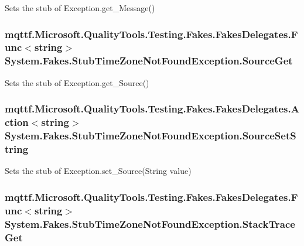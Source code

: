 Sets the stub of Exception.\-get\-\_\-\-Message()

\hypertarget{class_system_1_1_fakes_1_1_stub_time_zone_not_found_exception_a7784c90dbd515c3a17e0ddfee2022aed}{
\subsubsection[{Source\-Get}]{\setlength{\rightskip}{0pt plus 5cm}mqttf.\-Microsoft.\-Quality\-Tools.\-Testing.\-Fakes.\-Fakes\-Delegates.\-Func$<$string$>$ System.\-Fakes.\-Stub\-Time\-Zone\-Not\-Found\-Exception.\-Source\-Get}}\label{class_system_1_1_fakes_1_1_stub_time_zone_not_found_exception_a7784c90dbd515c3a17e0ddfee2022aed}


Sets the stub of Exception.\-get\-\_\-\-Source()

\hypertarget{class_system_1_1_fakes_1_1_stub_time_zone_not_found_exception_a2f222b92192c70897306738614d892a4}{
\subsubsection[{Source\-Set\-String}]{\setlength{\rightskip}{0pt plus 5cm}mqttf.\-Microsoft.\-Quality\-Tools.\-Testing.\-Fakes.\-Fakes\-Delegates.\-Action$<$string$>$ System.\-Fakes.\-Stub\-Time\-Zone\-Not\-Found\-Exception.\-Source\-Set\-String}}\label{class_system_1_1_fakes_1_1_stub_time_zone_not_found_exception_a2f222b92192c70897306738614d892a4}


Sets the stub of Exception.\-set\-\_\-\-Source(\-String value)

\hypertarget{class_system_1_1_fakes_1_1_stub_time_zone_not_found_exception_a052a61da20c1db43abb2c8684609d330}{
\subsubsection[{Stack\-Trace\-Get}]{\setlength{\rightskip}{0pt plus 5cm}mqttf.\-Microsoft.\-Quality\-Tools.\-Testing.\-Fakes.\-Fakes\-Delegates.\-Func$<$string$>$ System.\-Fakes.\-Stub\-Time\-Zone\-Not\-Found\-Exception.\-Stack\-Trace\-Get}}\label{class_system_1_1_fakes_1_1_stub_time_zone_not_found_exception_a052a61da20c1db43abb2c8684609d330}


